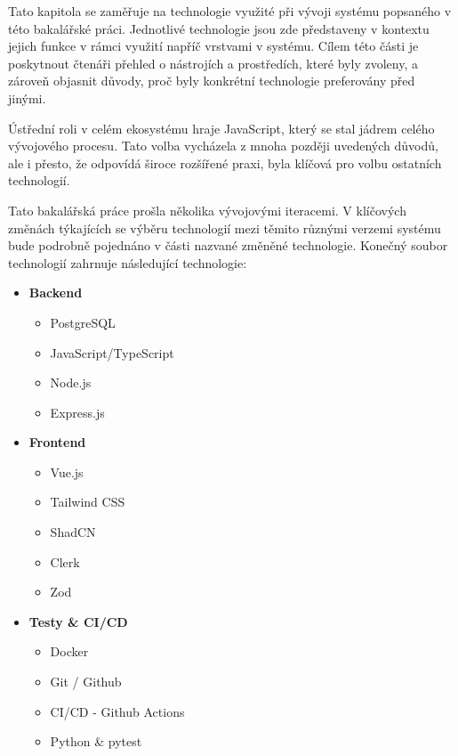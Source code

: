 Tato kapitola se zaměřuje na technologie využité při vývoji systému popsaného v této bakalářské práci. Jednotlivé technologie jsou zde představeny v kontextu jejich funkce v rámci využití napříč vrstvami v systému. Cílem této části je poskytnout čtenáři přehled o nástrojích a prostředích, které byly zvoleny, a zároveň objasnit důvody, proč byly konkrétní technologie preferovány před jinými.

Ústřední roli v celém ekosystému hraje JavaScript, který se stal jádrem celého vývojového procesu. Tato volba vycházela z mnoha později uvedených důvodů, ale i přesto, že odpovídá široce rozšířené praxi, byla klíčová pro volbu ostatních technologií.

Tato bakalářská práce prošla několika vývojovými iteracemi. V klíčových změnách týkajících se výběru technologií mezi těmito různými verzemi systému bude podrobně pojednáno v části nazvané změněné technologie. Konečný soubor technologií zahrnuje následující technologie: 
\begin{itemize}
    \item \textbf{Backend}
        \begin{itemize}
            \item PostgreSQL
            \item JavaScript/TypeScript
            \item Node.js
            \item Express.js
        \end{itemize}
    \item \textbf{Frontend}
        \begin{itemize}
            \item Vue.js
            \item Tailwind CSS
            \item ShadCN
            \item Clerk
            \item Zod
        \end{itemize}
    \item \textbf{Testy \& CI/CD}
        \begin{itemize}
            \item Docker
            \item Git / Github
            \item CI/CD - Github Actions
            \item Python \& pytest
        \end{itemize}    
\end{itemize}

